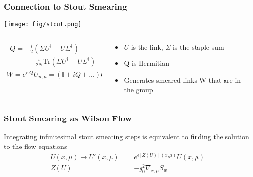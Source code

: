 \begin{frame}
  \addtocounter{framenumber}{-1}
  \frametitle{Connection to Stout Smearing}
  \begin{center}
    \texttt{[image: fig/stout.png]}
  \end{center}
  \begin{columns}[T]
    \begin{column}{.5\textwidth}
      \begin{block}{}
        \begin{align*}
          Q = & \frac{i}{2}(\Sigma U^{\dagger}-U\Sigma^{\dagger}) \\
              & - \frac{i}{2N}\text{Tr}(\Sigma U^{\dagger}-U\Sigma^{\dagger})
        \end{align*}
        \begin{align*}
          W=e^{ipQ}U_{n,\mu}=(\mathbb{I}+iQ+...)U_{n,\mu}
        \end{align*}
      \end{block}
    \end{column}
    \begin{column}{.5\textwidth}
      \begin{block}{}
        \begin{itemize}
          \item $U$ is the link, $\Sigma$ is the staple sum
          \item Q is Hermitian
          \item Generates smeared links W that are in the group
        \end{itemize}
      \end{block}
    \end{column}
  \end{columns}
\end{frame}

\begin{frame}
  \addtocounter{framenumber}{-1}
  \frametitle{Stout Smearing as Wilson Flow}
  Integrating infinitesimal stout smearing steps is equivalent to finding the solution to the flow equations
  \begin{align*}
    U(x,\mu)\rightarrow U'(x,\mu)&=e^{\epsilon [Z(U)](x,\mu)}U(x,\mu) \\
    Z(U) &=-g^2_0\nabla_{x,\mu}S_w
  \end{align*}
\end{frame}


